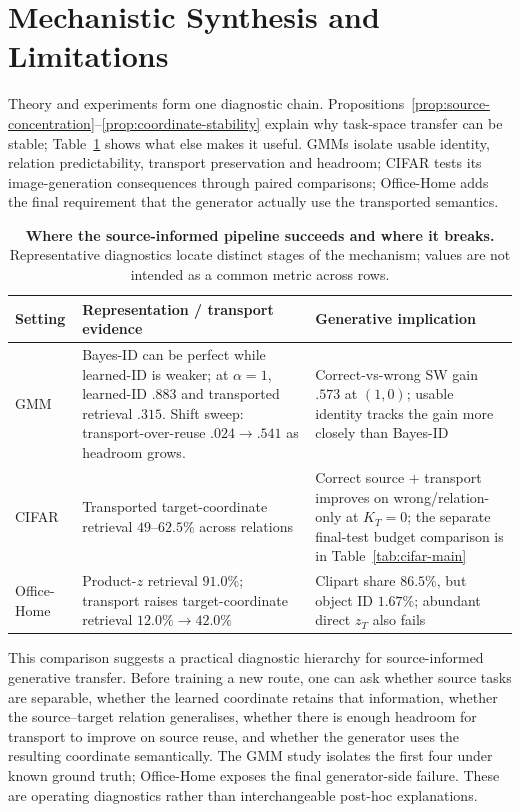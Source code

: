\documentclass{article}
\newcommand{\KT}{K_T}
\begin{document}
\section{Mechanistic Synthesis and Limitations}
\label{sec:synthesis}
Theory and experiments form one diagnostic chain. Propositions~\ref{prop:source-concentration}--\ref{prop:coordinate-stability} explain why task-space transfer can be stable; Table~\ref{tab:mechanism-synthesis} shows what else makes it useful. GMMs isolate usable identity, relation predictability, transport preservation and headroom; CIFAR tests its image-generation consequences through paired comparisons; Office-Home adds the final requirement that the generator actually use the transported semantics.

\begin{table}[t]
\centering\scriptsize
\caption{\textbf{Where the source-informed pipeline succeeds and where it breaks.} Representative diagnostics locate distinct stages of the mechanism; values are not intended as a common metric across rows.}
\label{tab:mechanism-synthesis}
\begin{tabular}{@{}p{.14\linewidth}p{.42\linewidth}p{.35\linewidth}@{}}
\toprule
Setting & Representation / transport evidence & Generative implication\\
\midrule
GMM & Bayes-ID can be perfect while learned-ID is weaker; at $\alpha=1$, learned-ID $.883$ and transported retrieval $.315$. Shift sweep: transport-over-reuse $.024\!\rightarrow\!.541$ as headroom grows. & Correct-vs-wrong SW gain $.573$ at $(1,0)$; usable identity tracks the gain more closely than Bayes-ID\\
CIFAR & Transported target-coordinate retrieval $49$--$62.5\%$ across relations & Correct source $+$ transport improves on wrong/relation-only at $\KT=0$; the separate final-test budget comparison is in Table~\ref{tab:cifar-main}\\
Office-Home & Product-$z$ retrieval $91.0\%$; transport raises target-coordinate retrieval $12.0\%\!\rightarrow\!42.0\%$ & Clipart share $86.5\%$, but object ID $1.67\%$; abundant direct $z_T$ also fails\\
\bottomrule
\end{tabular}
\end{table}

This comparison suggests a practical diagnostic hierarchy for source-informed generative transfer. Before training a new route, one can ask whether source tasks are separable, whether the learned coordinate retains that information, whether the source--target relation generalises, whether there is enough headroom for transport to improve on source reuse, and whether the generator uses the resulting coordinate semantically. The GMM study isolates the first four under known ground truth; Office-Home exposes the final generator-side failure. These are operating diagnostics rather than interchangeable post-hoc explanations.
\end{document}
